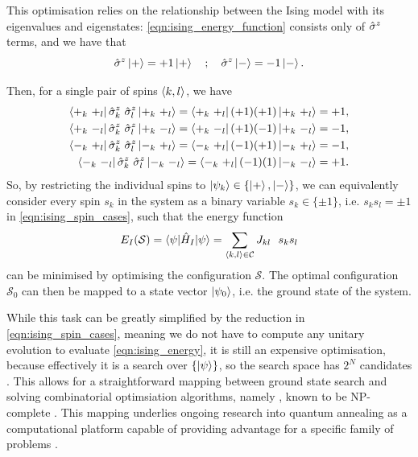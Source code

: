 This optimisation relies on the relationship between the Ising model with its eigenvalues and eigenstates:
    \cref{eqn:ising_energy_function} consists only of $\hat{\sigma}^{z}$ terms, and we have that 
\begin{equation}
    \sz \ket{+} = +1 \ket{+} \ \ \ ; \ \ \ 
    \sz \ket{-} = -1 \ket{-}. 
\end{equation}

Then, for a single pair of spins ${ \langle k, l \rangle }$, we have
\begin{equation}
    \label{eqn:ising_spin_cases}
    \begin{split}
        \bra{+_k \ +_l } \sz_k \ \sz_l  \ket{+_k \ +_l } =  \bra{+_k \ +_l } (+1)(+1) \ket{+_k \ +_l } = +1, \\
        \bra{+_k \ -_l } \sz_k \ \sz_l \ket{+_k \ -_l } = \bra{+_k \ -_l } (+1)(-1) \ket{+_k \ -_l } = -1 , \\
        \bra{-_k \ +_l } \sz_k \ \sz_l \ket{-_k \ +_l } = \bra{-_k \ +_l } (-1)(+1) \ket{-_k \ +_l } = -1, \\
        \bra{-_k \ -_l } \sz_k \ \sz_l \ket{-_k \ -_l } = \bra{-_k \ +_l } (-1)(1) \ket{-_k \ -_l } = +1. \\
    \end{split}
\end{equation}
So, by restricting the individual spins to $\ket{\psi_k} \in \{\ket{+}, \ket{-}\}$, 
    we can equivalently consider every spin $s_k$ in the system
    as a binary variable $s_k \in \{\pm 1\}$,
    i.e. $s_k s_l = \pm 1$ in \cref{eqn:ising_spin_cases},
    such that the energy function
\begin{equation}
    \label{eqn:ising_energy}
    E_I(\mathcal{S}) = \braket{ \psi | \hat{H}_I | \psi } = \sum\limits_{{ \langle k, l \rangle } \in { \mathcal{C}}} J_{kl} \ \ s_k s_l
\end{equation}
    can be minimised by optimising the configuration $\mathcal{S}$.
The optimal configuration $\mathcal{S}_0$ can then be mapped to a 
    state vector $\ket{\psi_0}$, i.e. the ground state of the system. 
\par 

While this task can be greatly simplified by the reduction in \cref{eqn:ising_spin_cases}, 
    meaning we do not have to compute any unitary evolution to evaluate \cref{eqn:ising_energy},
    it is still an expensive optimisation, because effectively it is a search over $\{ \ket{\psi }\}$, 
    so the search space has $2^N$ candidates \cite{onsager1944crystal, barahona1982computational}. 
This allows for a straightforward mapping between ground state search 
    and solving combinatorial optimsiation algorithms, namely , 
    known to be NP-complete \cite{garey1979computers}. 
This mapping underlies ongoing research into quantum annealing as a computational platform capable of providing 
    advantage for a specific family of problems \cite{santoro2006optimization, bapst2013quantum, johnson2011quantum}. 
\par

